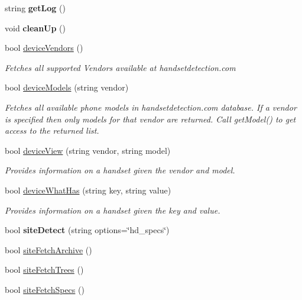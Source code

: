 \begin{DoxyCompactItemize}
\item 
\hypertarget{class_h_d3_1_1_h_d3_a2436e33681884291c6ad1b2ee112e17b}{string {\bfseries get\+Log} ()}\label{class_h_d3_1_1_h_d3_a2436e33681884291c6ad1b2ee112e17b}

\item 
\hypertarget{class_h_d3_1_1_h_d3_a0431d69035a8245a195f9060d5525790}{void {\bfseries clean\+Up} ()}\label{class_h_d3_1_1_h_d3_a0431d69035a8245a195f9060d5525790}

\item 
bool \hyperlink{class_h_d3_1_1_h_d3_aa2f63450321e2f47b2cb3baf8ff1a5e8}{device\+Vendors} ()
\begin{DoxyCompactList}\small\item\em Fetches all supported Vendors available at handsetdetection.\+com\end{DoxyCompactList}\item 
bool \hyperlink{class_h_d3_1_1_h_d3_a5af669048eb1d372a703dd53b242fe2f}{device\+Models} (string vendor)
\begin{DoxyCompactList}\small\item\em Fetches all available phone models in handsetdetection.\+com database. If a vendor is specified then only models for that vendor are returned. Call get\+Model() to get access to the returned list. \end{DoxyCompactList}\item 
bool \hyperlink{class_h_d3_1_1_h_d3_aaba6d717a4579ca6fa7c5727e5d92333}{device\+View} (string vendor, string model)
\begin{DoxyCompactList}\small\item\em Provides information on a handset given the vendor and model. \end{DoxyCompactList}\item 
bool \hyperlink{class_h_d3_1_1_h_d3_a9640edbaf4dd41cd1c8bec9fa86f53a6}{device\+What\+Has} (string key, string value)
\begin{DoxyCompactList}\small\item\em Provides information on a handset given the key and value. \end{DoxyCompactList}\item 
\hypertarget{class_h_d3_1_1_h_d3_a094f2de65aed6b70560ae08c8fabfb2b}{bool {\bfseries site\+Detect} (string options=\char`\"{}hd\+\_\+specs\char`\"{})}\label{class_h_d3_1_1_h_d3_a094f2de65aed6b70560ae08c8fabfb2b}

\item 
bool \hyperlink{class_h_d3_1_1_h_d3_af615c943aace3228c387e3a0a66bac23}{site\+Fetch\+Archive} ()
\item 
bool \hyperlink{class_h_d3_1_1_h_d3_ab7987ac1e6295533e55dcd5d300ae9cc}{site\+Fetch\+Trees} ()
\item 
bool \hyperlink{class_h_d3_1_1_h_d3_ae8d86be9f088829ebe42214cfb26672e}{site\+Fetch\+Specs} ()
\end{DoxyCompactItemize}
